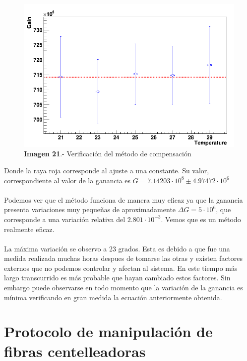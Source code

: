 \documentclass[11pt, a4paper]{article}
\begin{document}
\begin{figure}[hbtp]
\centering
\includegraphics[scale=0.2]{compensacion.png}
\caption{\textbf{Imagen 21}.- Verificación del método de compensación}
\end{figure}

Donde la raya roja corresponde al ajuste a una constante. Su valor, correspondiente al valor de la ganancia es $G=7.14203 \cdot 10^8 \pm 4.97472 \cdot 10^6$

\paragraph {}
Podemos ver que el método funciona de manera muy eficaz ya que la ganancia presenta variaciones muy pequeñas de aproximadamente $\Delta G=5 \cdot 10^6$, que corresponde a una variación relativa del $2.801 \cdot 10^{-3} $. Vemos que es un método realmente eficaz.
\paragraph {}
La máxima variación se observo a 23 grados. Esta es debido a que fue una medida realizada muchas horas despues de tomarse las otras y existen factores externos que no podemos controlar y afectan al sistema. En este tiempo más largo transcurrido es más probable que hayan cambiado estos factores. Sin embargo puede observarse en todo momento que la variación de la ganancia es mínima verificando en gran medida la ecuación anteriormente obtenida.





\section {Protocolo de manipulación de fibras centelleadoras}
\end{document}
